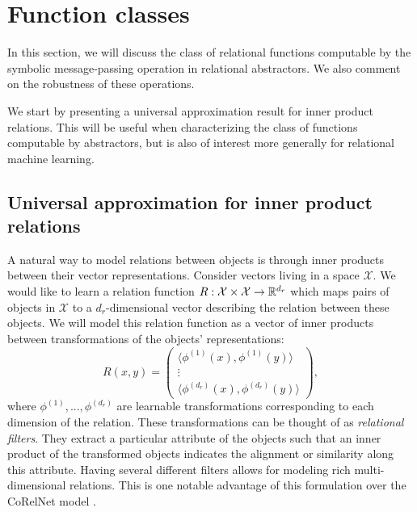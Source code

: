 \def\rdot{\bigcdot}
\def\F{{\mathfrak{F}}}

\section{Function classes}
\label{sec:function_spaces}

In this section, we will discuss the class of relational functions computable by the symbolic message-passing operation in relational abstractors. We also comment on the robustness of these operations.

We start by presenting a universal approximation result for inner product relations. This will be useful when characterizing the class of functions computable by abstractors, but is also of interest more generally for relational machine learning.

\subsection{Universal approximation for inner product relations}

A natural way to model relations between objects is through inner products between their vector representations. Consider vectors living in a space $\mathcal{X}$. We would like to learn a relation function $R: \mathcal{X} \times \mathcal{X} \to \mathbb{R}^{d_r}$ which maps pairs of objects in $\mathcal{X}$ to a $d_r$-dimensional vector describing the relation between these objects. We will model this relation function as a vector of inner products between transformations of the objects' representations:
\begin{equation}
	\label{eq:inner_product_relations}
	R(x, y) = \begin{pmatrix}\langle \phi^{(1)}(x), \phi^{(1)}(y) \rangle \\ \vdots \\ \langle \phi^{(d_r)}(x), \phi^{(d_r)}(y) \rangle \end{pmatrix},
\end{equation}
where $\phi^{(1)}, ..., \phi^{(d_r)}$ are learnable transformations corresponding to each dimension of the relation. These transformations can be thought of as \textit{relational filters}. They extract a particular attribute of the objects such that an inner product of the transformed objects indicates the alignment or similarity along this attribute. Having several different filters allows for modeling rich multi-dimensional relations. This is one notable advantage of this formulation over the CoRelNet model \citep{kerg2022neural}.

